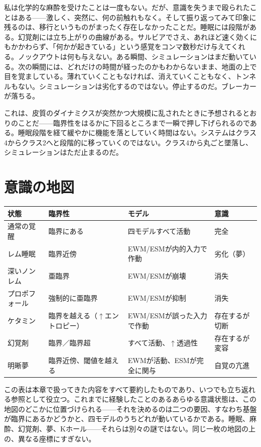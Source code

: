 \documentclass[11pt, twoside, openright]{book}
\begin{document}
私は化学的な麻酔を受けたことは一度もない。だが、意識を失うまで殴られたことはある------激しく、突然に、何の前触れもなく。そして振り返ってみて印象に残るのは、移行というものがまったく存在しなかったことだ。睡眠には段階がある。幻覚剤には立ち上がりの曲線がある。サルビアでさえ、あれほど速く効くにもかかわらず、「何かが起きている」という感覚をコンマ数秒だけ与えてくれる。ノックアウトは何も与えない。ある瞬間、シミュレーションはまだ動いている。次の瞬間には、どれだけの時間が経ったのかもわからないまま、地面の上で目を覚ましている。薄れていくこともなければ、消えていくこともなく、トンネルもない。シミュレーションは劣化するのではない。停止するのだ。ブレーカーが落ちる。

これは、皮質のダイナミクスが突然かつ大規模に乱されたときに予想されるとおりのことだ------臨界性をはるかに下回るところまで一瞬で押し下げられるのである。睡眠段階を経て緩やかに機能を落としていく時間はない。システムはクラス4からクラス2へと段階的に移っていくのではない。クラス4から丸ごと墜落し、シミュレーションはただ止まるのだ。

\section*{意識の地図}


{\small
\noindent
\begin{tabularx}{\linewidth}{X X X X}
\toprule
\textbf{状態} & \textbf{臨界性} & \textbf{モデル} & \textbf{意識} \\
\midrule
通常の覚醒 & 臨界にある & 四モデルすべて活動 & 完全 \\[4pt]
レム睡眠 & 臨界近傍 & EWM/ESMが内的入力で作動 & 劣化（夢） \\[4pt]
深いノンレム & 亜臨界 & EWM/ESMが崩壊 & 消失 \\[4pt]
プロポフォール & 強制的に亜臨界 & EWM/ESMが抑制 & 消失 \\[4pt]
ケタミン & 臨界を越える（$\uparrow$エントロピー） & EWM/ESMが誤った入力で作動 & 存在するが切断 \\[4pt]
幻覚剤 & 臨界／臨界超 & すべて活動、$\uparrow$透過性 & 存在するが変容 \\[4pt]
明晰夢 & 臨界近傍、閾値を越える & EWMが活動、ESMが完全に関与 & 自覚の亢進 \\[4pt]
\bottomrule
\end{tabularx}
}


この表は本章で扱ってきた内容をすべて要約したものであり、いつでも立ち返れる参照として役立つ。これまでに経験したことのあるあらゆる意識状態は、この地図のどこかに位置づけられる------それを決めるのは二つの要因、すなわち基盤が臨界にあるかどうかと、四モデルのうちどれが動いているかである。睡眠、麻酔、幻覚剤、夢、Kホール------それらは別々の謎ではない。同じ一枚の地図の上の、異なる座標にすぎない。
\end{document}
